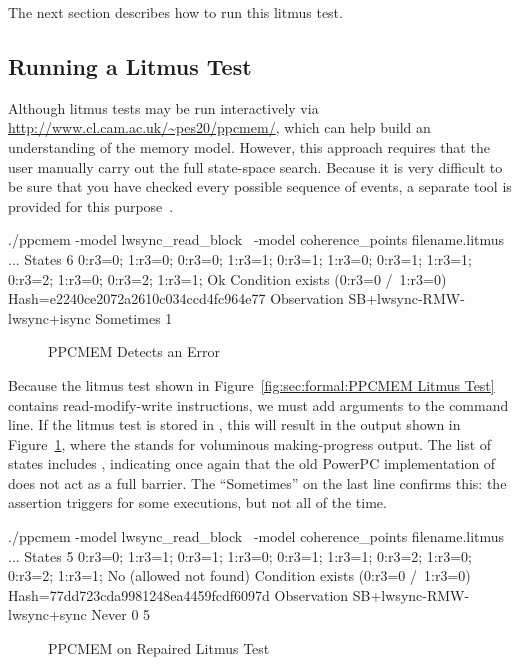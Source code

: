 The next section describes how to run this litmus test.

\subsection{Running a Litmus Test}
\label{sec:formal:Running a Litmus Test}

Although litmus tests may be run interactively via
\url{http://www.cl.cam.ac.uk/~pes20/ppcmem/}, which can help build an
understanding of the memory model.
However, this approach requires that the user manually carry out the
full state-space search.
Because it is very difficult to be sure that you have checked every
possible sequence of events, a separate tool is provided for this
purpose~\cite{PaulEMcKenney2011ppcmem}.

{ \scriptsize
\begin{verbbox}
./ppcmem -model lwsync_read_block \
         -model coherence_points filename.litmus
...
States 6
0:r3=0; 1:r3=0;
0:r3=0; 1:r3=1;
0:r3=1; 1:r3=0;
0:r3=1; 1:r3=1;
0:r3=2; 1:r3=0;
0:r3=2; 1:r3=1;
Ok
Condition exists (0:r3=0 /\ 1:r3=0)
Hash=e2240ce2072a2610c034ccd4fc964e77
Observation SB+lwsync-RMW-lwsync+isync Sometimes 1
\end{verbbox}
}
\begin{figure}[tbp]
\centering
\theverbbox
\caption{PPCMEM Detects an Error}
\label{fig:sec:formal:PPCMEM Detects an Error}
\end{figure}

Because the litmus test shown in
Figure~\ref{fig:sec:formal:PPCMEM Litmus Test}
contains read-modify-write instructions, we must add 
arguments to the command line.
If the litmus test is stored in ,
this will result in the output shown in
Figure~\ref{fig:sec:formal:PPCMEM Detects an Error},
where the  stands for voluminous making-progress output.
The list of states includes \co{0:r3=0; 1:r3=0;}, indicating once again
that the old PowerPC implementation of \co{atomic_add_return()} does
not act as a full barrier.
The ``Sometimes'' on the last line confirms this: the assertion triggers
for some executions, but not all of the time.

{ \scriptsize
\begin{verbbox}
./ppcmem -model lwsync_read_block \
         -model coherence_points filename.litmus
...
States 5
0:r3=0; 1:r3=1;
0:r3=1; 1:r3=0;
0:r3=1; 1:r3=1;
0:r3=2; 1:r3=0;
0:r3=2; 1:r3=1;
No (allowed not found)
Condition exists (0:r3=0 /\ 1:r3=0)
Hash=77dd723cda9981248ea4459fcdf6097d
Observation SB+lwsync-RMW-lwsync+sync Never 0 5
\end{verbbox}
}
\begin{figure}[tbp]
\centering
\theverbbox
\caption{PPCMEM on Repaired Litmus Test}
\label{fig:sec:formal:PPCMEM on Repaired Litmus Test}
\end{figure}

